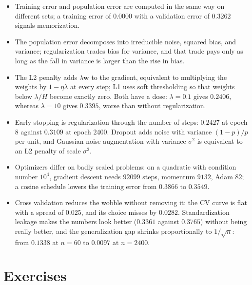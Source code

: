 \begin{ringkasan}
\begin{itemize}
  \item Training error and population error are computed in the same way on different
        sets; a training error of $0.0000$ with a validation error of $0.3262$ signals
        memorization.
  \item The population error decomposes into irreducible noise, squared bias, and
        variance; regularization trades bias for variance, and that trade pays only as
        long as the fall in variance is larger than the rise in bias.
  \item The L2 penalty adds $\lambda\mathbf{w}$ to the gradient, equivalent to
        multiplying the weights by $1-\eta\lambda$ at every step; L1 uses soft
        thresholding so that weights below $\lambda/H$ become exactly zero. Both have a
        dose: $\lambda=0.1$ gives $0.2406$, whereas $\lambda=10$ gives $0.3395$, worse
        than without regularization.
  \item Early stopping is regularization through the number of steps: $0.2427$ at
        epoch 8 against $0.3109$ at epoch 2400. Dropout adds noise with variance
        $(1-p)/p$ per unit, and Gaussian-noise augmentation with variance $\sigma^2$ is
        equivalent to an L2 penalty of scale $\sigma^2$.
  \item Optimizers differ on badly scaled problems: on a quadratic with condition
        number $10^4$, gradient descent needs $92099$ steps, momentum $9132$, Adam
        $82$; a cosine schedule lowers the training error from $0.3866$ to $0.3549$.
  \item Cross validation reduces the wobble without removing it: the CV curve is flat
        with a spread of $0.025$, and its choice misses by $0.0282$. Standardization
        leakage makes the numbers look better ($0.3361$ against $0.3765$) without being
        really better, and the generalization gap shrinks proportionally to $1/\sqrt n$:
        from $0.1338$ at $n=60$ to $0.0097$ at $n=2400$.
\end{itemize}
\end{ringkasan}

\section{Exercises}

